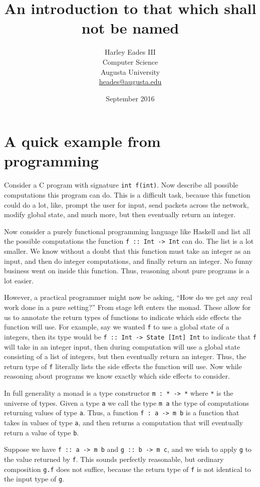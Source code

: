 \documentclass{article}
\title{An introduction to that which shall not be named}
\author{Harley Eades III\\Computer Science\\Augusta University\\\href{mailto:heades@augusta.edu}{heades@augusta.edu}}
\date{September 2016}
\begin{document}
\maketitle

\section{A quick example from programming}
\label{sec:a_quick_example_from_programming}
Consider a C program with signature \verb!int f(int)!.  Now describe
all possible computations this program can do.  This is a difficult
task, because this function could do a lot, like, prompt the user for
input, send packets across the network, modify global state, and much
more, but then eventually return an integer.

Now consider a purely functional programming language like Haskell
\cite{Haskell} and list all the possible computations the function
\verb!f :: Int -> Int! can do. The list is a lot smaller.  We know
without a doubt that this function must take an integer as an input,
and then do integer computations, and finally return an integer.  No
funny business went on inside this function.  Thus, reasoning about
pure programs is a lot easier.

However, a practical programmer might now be asking, ``How do we get
any real work done in a pure setting?''  From stage left enters the
monad.  These allow for us to annotate the return types of functions
to indicate which side effects the function will use.  For example,
say we wanted \verb!f! to use a global state of a integers, then its
type would be \verb!f :: Int -> State [Int] Int! to indicate that
\verb!f! will take in an integer input, then during computation will
use a global state consisting of a list of integers, but then
eventually return an integer.  Thus, the return type of \verb!f!
literally lists the side effects the function will use.  Now while
reasoning about programs we know exactly which side effects to
consider.

In full generality a monad is a type constructor \verb!m : * -> *!
where \verb!*! is the universe of types.  Given a type \verb!a! we
call the type \verb!m a! the type of computations returning values
of type \verb!a!.  Thus, a function \verb!f : a -> m b! is a function that
takes in values of type \verb!a!, and then returns a computation that
will eventually return a value of type \verb!b!.

Suppose we have \verb!f :: a -> m b! and \verb!g :: b -> m c!, and we
wish to apply \verb!g! to the value returned by \verb!f!. This sounds
perfectly reasonable, but ordinary composition \verb!g.f! does not
suffice, because the return type of \verb!f! is not identical to the
input type of \verb!g!.  
\end{document}
